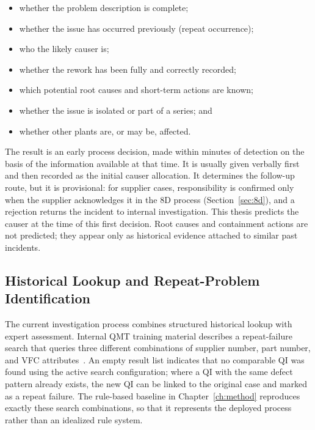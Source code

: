 \begin{itemize}
  \item whether the problem description is complete;
  \item whether the issue has occurred previously (repeat occurrence);
  \item who the likely causer is;
  \item whether the rework has been fully and correctly recorded;
  \item which potential root causes and short-term actions are known;
  \item whether the issue is isolated or part of a series; and
  \item whether other plants are, or may be, affected.
\end{itemize}

The result is an early process decision, made within minutes of detection
on the basis of the information available at that time. It is usually
given verbally first and then recorded as the initial causer allocation.
It determines the follow-up route, but it is provisional: for supplier
cases, responsibility is confirmed only when the supplier acknowledges it
in the 8D process (Section~\ref{sec:8d}), and a rejection returns the
incident to internal investigation. This thesis predicts the causer at the
time of this first decision. Root causes and containment actions are not
predicted; they appear only as historical evidence attached to similar
past incidents.

\subsection{Historical Lookup and Repeat-Problem Identification}\label{sec:fund_bmw_lookup}

The current investigation process combines structured historical lookup
with expert assessment. Internal QMT training material describes a
repeat-failure search that queries three different combinations of
supplier number, part number, and VFC attributes~\cite{bmwint_frontdesk}.
An empty result list indicates that no comparable QI was found using the
active search configuration; where a QI with the same defect pattern
already exists, the new QI can be linked to the original case and marked
as a repeat failure. The rule-based baseline in Chapter~\ref{ch:method}
reproduces exactly these search combinations, so that it represents the
deployed process rather than an idealized rule system.

